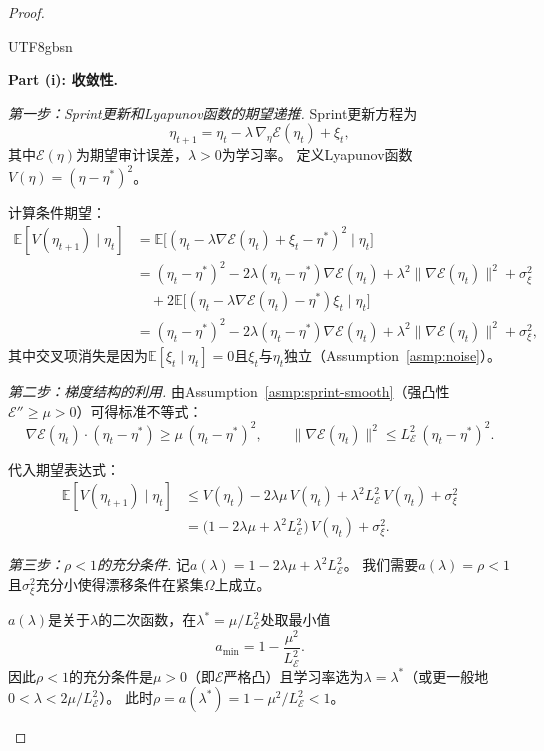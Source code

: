 \documentclass[12pt,a4paper]{article}
\newcommand{\E}{\mathbb{E}}
\begin{document}
\begin{proof}
\label{pf:sprint-limit}
\begin{CJK}{UTF8}{gbsn}

\textbf{Part (i): 收敛性.}

\emph{第一步：Sprint更新和Lyapunov函数的期望递推.}
Sprint更新方程为
\[
\eta_{t+1} = \eta_t - \lambda\,\nabla_\eta\mathcal{E}(\eta_t) + \xi_t,
\]
其中$\mathcal{E}(\eta)$为期望审计误差，$\lambda>0$为学习率。
定义Lyapunov函数$V(\eta) = (\eta - \eta^*)^2$。

计算条件期望：
\[
\begin{aligned}
\E[V(\eta_{t+1}) \mid \eta_t]
&= \E\bigl[(\eta_t - \lambda\nabla\mathcal{E}(\eta_t) + \xi_t - \eta^*)^2 \mid \eta_t\bigr] \\
&= (\eta_t - \eta^*)^2
   - 2\lambda(\eta_t - \eta^*)\nabla\mathcal{E}(\eta_t)
   + \lambda^2\|\nabla\mathcal{E}(\eta_t)\|^2
   + \sigma_\xi^2 \\
&\quad + 2\E\bigl[(\eta_t - \lambda\nabla\mathcal{E}(\eta_t) - \eta^*)\xi_t \mid \eta_t\bigr] \\
&= (\eta_t - \eta^*)^2
   - 2\lambda(\eta_t - \eta^*)\nabla\mathcal{E}(\eta_t)
   + \lambda^2\|\nabla\mathcal{E}(\eta_t)\|^2
   + \sigma_\xi^2,
\end{aligned}
\]
其中交叉项消失是因为$\E[\xi_t \mid \eta_t] = 0$且$\xi_t$与$\eta_t$独立（Assumption~\ref{asmp:noise}）。

\emph{第二步：梯度结构的利用.}
由Assumption~\ref{asmp:sprint-smooth}（强凸性$\mathcal{E}'' \ge \mu > 0$）可得标准不等式：
\[
\nabla\mathcal{E}(\eta_t) \cdot (\eta_t - \eta^*) \ge \mu\,(\eta_t - \eta^*)^2,
\qquad
\|\nabla\mathcal{E}(\eta_t)\|^2 \le L_{\mathcal{E}}^2\,(\eta_t - \eta^*)^2.
\]

代入期望表达式：
\[
\begin{aligned}
\E[V(\eta_{t+1}) \mid \eta_t]
&\le V(\eta_t)
   - 2\lambda\mu\,V(\eta_t)
   + \lambda^2 L_{\mathcal{E}}^2\,V(\eta_t)
   + \sigma_\xi^2 \\
&= \bigl(1 - 2\lambda\mu + \lambda^2 L_{\mathcal{E}}^2\bigr)\,V(\eta_t)
   + \sigma_\xi^2.
\end{aligned}
\]

\emph{第三步：$\rho < 1$的充分条件.}
记$a(\lambda) = 1 - 2\lambda\mu + \lambda^2 L_{\mathcal{E}}^2$。
我们需要$a(\lambda) = \rho < 1$且$\sigma_\xi^2$充分小使得漂移条件在紧集$\Omega$上成立。

$a(\lambda)$是关于$\lambda$的二次函数，在$\lambda^* = \mu/L_{\mathcal{E}}^2$处取最小值
\[
a_{\min} = 1 - \frac{\mu^2}{L_{\mathcal{E}}^2}.
\]
因此$\rho < 1$的充分条件是$\mu > 0$（即$\mathcal{E}$严格凸）且学习率选为$\lambda = \lambda^*$（或更一般地$0 < \lambda < 2\mu/L_{\mathcal{E}}^2$）。
此时$\rho = a(\lambda^*) = 1 - \mu^2/L_{\mathcal{E}}^2 < 1$。


\end{CJK}
\end{proof}
\end{document}
